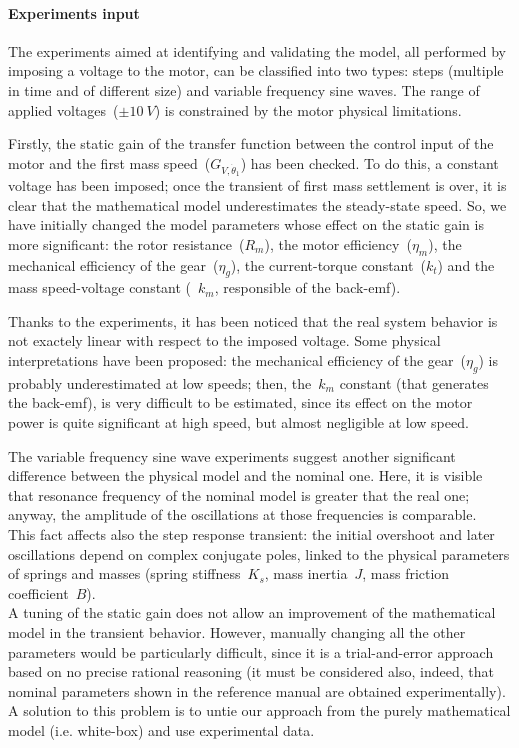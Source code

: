 \paragraph{Experiments input}
The experiments aimed at identifying and validating the model, all performed by imposing a voltage to the motor, can be classified into two types: steps (multiple in time and of different size) and variable frequency sine waves. The range of applied voltages~($\pm 10\ V$) is constrained by the motor physical limitations.

Firstly, the static gain of the transfer function between the control input of the motor and the first mass speed~($G_{V,\dot{\theta}_1}$) has been checked. To do this, a constant voltage has been imposed; once the transient of first mass settlement is over, it is clear that the mathematical model underestimates the steady-state speed.
So, we have initially changed the model parameters whose effect on the static gain is more significant: the rotor resistance~($R_m$), the motor efficiency~($\eta_m$), the mechanical efficiency of the gear~($\eta_g$), the current-torque constant~($k_t$) and the mass speed-voltage constant (~$k_m$, responsible of the back-emf).

Thanks to the experiments, it has been noticed that the real system behavior is not exactely linear with respect to the imposed voltage. Some physical interpretations have been proposed: the mechanical efficiency of the gear~($\eta_g$) is probably underestimated at low speeds; then, the~$k_m$ constant (that generates the back-emf), is very difficult to be estimated, since its effect on the motor power is quite significant at high speed, but almost negligible at low speed.


The variable frequency sine wave experiments suggest another significant difference between the physical model and the nominal one. Here, it is visible that resonance frequency of the nominal model is greater that the real one; anyway, the amplitude of the oscillations at those frequencies is comparable. \\
This fact affects also the step response transient: the initial overshoot and later oscillations depend on complex conjugate poles, linked to the physical parameters of springs and masses (spring stiffness~$K_s$, mass inertia~$J$, mass friction coefficient~$B$). \\

A tuning of the static gain does not allow an improvement of the mathematical model in the transient behavior. However, manually changing all the other parameters would be particularly difficult, since it is a trial-and-error approach based on no precise rational reasoning (it must be considered also, indeed, that nominal parameters shown in the reference manual are obtained experimentally).
A solution to this problem is to untie our approach from the purely mathematical model (i.e. white-box) and use experimental data.

